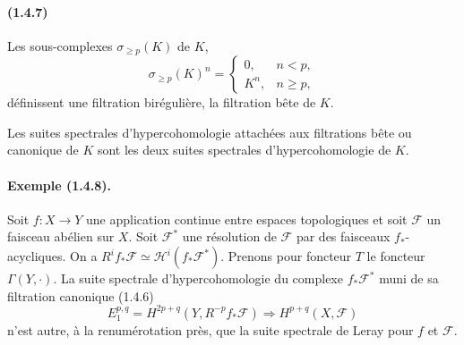 \documentclass[10pt]{article}
\newcommand{\calH}{\mathcal H}
\newcommand{\calF}{\mathcal F}
\begin{document}
\paragraph{(1.4.7)} Les sous-complexes $\sigma_{\ge p}(K)$ de $K$,
\[
\sigma_{\ge p}(K)^n=\begin{cases}
0,& n<p,\\
K^n,& n\ge p,
\end{cases}
\]
définissent une filtration birégulière, la filtration bête de $K$.

Les suites spectrales d'hypercohomologie attachées aux filtrations bête ou canonique de $K$ sont les deux suites spectrales d'hypercohomologie de $K$.

\paragraph{Exemple (1.4.8).} Soit $f:X\to Y$ une application continue entre espaces topologiques et soit $\calF$ un faisceau abélien sur $X$. Soit $\calF^*$ une résolution de $\calF$ par des faisceaux $f_*$-acycliques. On a $R^if_*\calF\simeq\calH^i(f_*\calF^*)$. Prenons pour foncteur $T$ le foncteur $\Gamma(Y,\cdot)$. La suite spectrale d'hypercohomologie du complexe $f_*\calF^*$ muni de sa filtration canonique (1.4.6)
\[
E_1^{p,q}=H^{2p+q}(Y,R^{-p}f_*\calF)\Rightarrow H^{p+q}(X,\calF)
\]
n'est autre, à la renumérotation près, que la suite spectrale de Leray pour $f$ et $\calF$.
\end{document}
